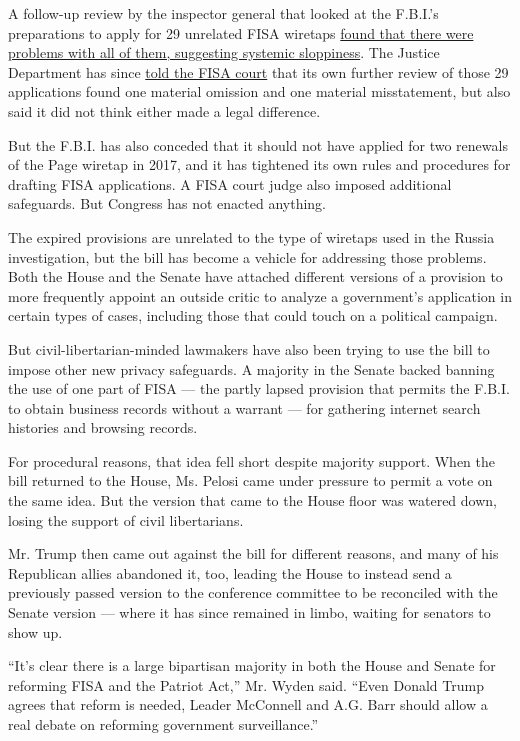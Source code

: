 A follow-up review by the inspector general that looked at the F.B.I.'s
preparations to apply for 29 unrelated FISA wiretaps
\href{https://www.nytimes3xbfgragh.onion/2020/03/31/us/politics/fbi-fisa-wiretap-trump.html}{found
that there were problems with all of them, suggesting systemic
sloppiness}. The Justice Department has since
\href{https://www.justice.gov/opa/pr/statement-assistant-attorney-general-national-security-john-c-demers-public-release}{told
the FISA court} that its own further review of those 29 applications
found one material omission and one material misstatement, but also said
it did not think either made a legal difference.

But the F.B.I. has also conceded that it should not have applied for two
renewals of the Page wiretap in 2017, and it has tightened its own rules
and procedures for drafting FISA applications. A FISA court judge also
imposed additional safeguards. But Congress has not enacted anything.

The expired provisions are unrelated to the type of wiretaps used in the
Russia investigation, but the bill has become a vehicle for addressing
those problems. Both the House and the Senate have attached different
versions of a provision to more frequently appoint an outside critic to
analyze a government's application in certain types of cases, including
those that could touch on a political campaign.

But civil-libertarian-minded lawmakers have also been trying to use the
bill to impose other new privacy safeguards. A majority in the Senate
backed banning the use of one part of FISA --- the partly lapsed
provision that permits the F.B.I. to obtain business records without a
warrant --- for gathering internet search histories and browsing
records.

For procedural reasons, that idea fell short despite majority support.
When the bill returned to the House, Ms. Pelosi came under pressure to
permit a vote on the same idea. But the version that came to the House
floor was watered down, losing the support of civil libertarians.

Mr. Trump then came out against the bill for different reasons, and many
of his Republican allies abandoned it, too, leading the House to instead
send a previously passed version to the conference committee to be
reconciled with the Senate version --- where it has since remained in
limbo, waiting for senators to show up.

``It's clear there is a large bipartisan majority in both the House and
Senate for reforming FISA and the Patriot Act,'' Mr. Wyden said. ``Even
Donald Trump agrees that reform is needed, Leader McConnell and A.G.
Barr should allow a real debate on reforming government surveillance.''


